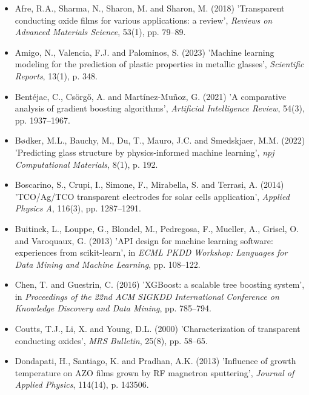 \documentclass[12pt, oneside]{article} %
\begin{document}
\begin{itemize}[leftmargin=1.5em, label={}, itemsep=2mm]

\item Afre, R.A., Sharma, N., Sharon, M. and Sharon, M. (2018) 'Transparent conducting oxide films for various applications: a review', \textit{Reviews on Advanced Materials Science}, 53(1), pp. 79--89.

\item Amigo, N., Valencia, F.J. and Palominos, S. (2023) 'Machine learning modeling for the prediction of plastic properties in metallic glasses', \textit{Scientific Reports}, 13(1), p. 348.

\item Bent\'{e}jac, C., Cs\"{o}rg\H{o}, A. and Mart\'{i}nez-Mu\~{n}oz, G. (2021) 'A comparative analysis of gradient boosting algorithms', \textit{Artificial Intelligence Review}, 54(3), pp. 1937--1967.

\item B{\o}dker, M.L., Bauchy, M., Du, T., Mauro, J.C. and Smedskjaer, M.M. (2022) 'Predicting glass structure by physics-informed machine learning', \textit{npj Computational Materials}, 8(1), p. 192.

\item Boscarino, S., Crupi, I., Simone, F., Mirabella, S. and Terrasi, A. (2014) 'TCO/Ag/TCO transparent electrodes for solar cells application', \textit{Applied Physics A}, 116(3), pp. 1287--1291.

\item Buitinck, L., Louppe, G., Blondel, M., Pedregosa, F., Mueller, A., Grisel, O. and Varoquaux, G. (2013) 'API design for machine learning software: experiences from scikit-learn', in \textit{ECML PKDD Workshop: Languages for Data Mining and Machine Learning}, pp. 108--122.

\item Chen, T. and Guestrin, C. (2016) 'XGBoost: a scalable tree boosting system', in \textit{Proceedings of the 22nd ACM SIGKDD International Conference on Knowledge Discovery and Data Mining}, pp. 785--794.

\item Coutts, T.J., Li, X. and Young, D.L. (2000) 'Characterization of transparent conducting oxides', \textit{MRS Bulletin}, 25(8), pp. 58--65.

\item Dondapati, H., Santiago, K. and Pradhan, A.K. (2013) 'Influence of growth temperature on AZO films grown by RF magnetron sputtering', \textit{Journal of Applied Physics}, 114(14), p. 143506.


\end{itemize}
\end{document}
